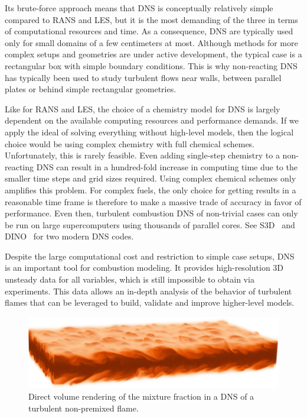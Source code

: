 %
Its brute-force approach means that \ac{DNS} is conceptually relatively simple
compared to \ac{RANS} and \ac{LES}, but it is the most demanding of the three
in terms of computational resources and time.
%
As a consequence, \ac{DNS} are typically used only for small domains of a few
centimeters at most.
%
Although methods for more complex setups and geometries are under active
development, the typical case is a rectangular box with simple boundary
conditions.
%
This is why non-reacting \ac{DNS} has typically been used to study turbulent
flows near walls, between parallel plates or behind simple rectangular
geometries.
%

%
Like for \ac{RANS} and \ac{LES}, the choice of a chemistry model for \ac{DNS} is
largely dependent on the available computing resources and performance demands.
%
If we apply the ideal of solving everything without high-level models, then the
logical choice would be using complex chemistry with full chemical schemes.
%
Unfortunately, this is rarely feasible.
%
Even adding single-step chemistry to a non-reacting \ac{DNS} can result in a
hundred-fold increase in computing time due to the smaller time steps and grid
sizes required.
%
Using complex chemical schemes only amplifies this problem.
%
For complex fuels, the only choice for getting results in a reasonable time
frame is therefore to make a massive trade of accuracy in favor of performance.
%
Even then, turbulent combustion \ac{DNS} of non-trivial cases can only be run
on large supercomputers using thousands of parallel cores.
%
See S3D~\cite{Chen2009,Treichler2017} and DINO~\cite{Abdelsamie2016} for two
modern \ac{DNS} codes.
%

%
Despite the large computational cost and restriction to simple case setups,
\ac{DNS} is an important tool for combustion modeling.
%
It provides high-resolution \ac{3D} unsteady data for all variables, which is
still impossible to obtain via experiments.
%
This data allows an in-depth analysis of the behavior of turbulent flames that
can be leveraged to build, validate and improve higher-level models.
%
\begin{figure}[t]
    \centering
    \includegraphics[width=\textwidth]{figures/Hawkes_VolRend.png}
    \caption{Direct volume rendering of the mixture fraction in a
    \ac{DNS} of a turbulent non-premixed flame.}
    \label{fig:turbulent_diffusion_flame_dns}
\end{figure}
%

